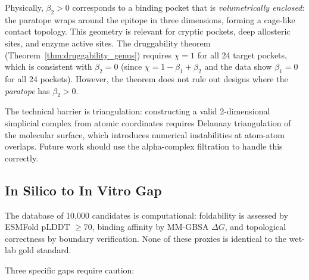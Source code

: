 Physically, $\beta_2 > 0$ corresponds to a binding pocket that is
\emph{volumetrically enclosed}: the paratope wraps around the epitope in three
dimensions, forming a cage-like contact topology.  This geometry is relevant
for cryptic pockets, deep allosteric sites, and enzyme active sites.  The
druggability theorem (Theorem~\ref{thm:druggability_genus}) requires $\chi = 1$
for all 24 target pockets, which is consistent with $\beta_2 = 0$ (since
$\chi = 1 - \beta_1 + \beta_2$ and the data show $\beta_1 = 0$ for all 24
pockets).  However, the theorem does not rule out designs where the
\emph{paratope} has $\beta_2 > 0$.

The technical barrier is triangulation: constructing a valid 2-dimensional
simplicial complex from atomic coordinates requires Delaunay triangulation of
the molecular surface, which introduces numerical instabilities at atom-atom
overlaps.  Future work should use the alpha-complex filtration \cite{edelsbrunner2002topological}
to handle this correctly.

\subsection{In Silico to In Vitro Gap}
\label{subsec:insilico_gap}

The database of 10,000 candidates is computational: foldability is assessed by
ESMFold pLDDT $\ge 70$, binding affinity by MM-GBSA $\Delta G$, and topological
correctness by \PLQ{} boundary verification.  None of these proxies is
identical to the wet-lab gold standard.

Three specific gaps require caution:

